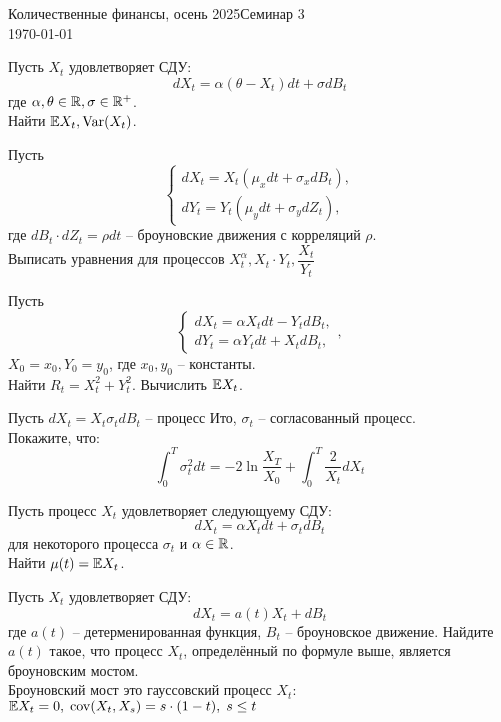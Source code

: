 \documentclass[12pt]{article}
\begin{document}
\noindent Количественные финансы, осень 2025\hfill Семинар 3\\
\today

\hrulefill
\begin{problem}
    Пусть $X_t$ удовлетворяет СДУ:
    $$
        dX_t = \alpha (\theta -  X_t) dt + \sigma dB_t
    $$где $\alpha, \theta \in \mathbb{R}, \sigma \in \mathbb{R}^+$. \\
    Найти $\mathbb{E} X_t, \mathrm{Var}(X_t)$. 
\end{problem}
 
\begin{problem}
    Пусть
    $$\begin{cases}
        dX_t = X_t (\mu_x dt + \sigma_x dB_t), \\
        dY_t = Y_t (\mu_y dt + \sigma_y dZ_t),
    \end{cases}$$
    где $dB_t\cdot dZ_t = \rho dt$ -- броуновские движения с корреляций $\rho$. 
    \\ Выписать уравнения для процессов $X_t^{\alpha}, X_t \cdot Y_t, \dfrac{X_t}{Y_t}$
\end{problem}

\begin{problem}
    Пусть
    $$\begin{cases}
        dX_t = \alpha X_t dt - Y_t dB_t, \\
        dY_t = \alpha Y_t dt + X_t dB_t,
    \end{cases},$$ $X_0=x_0, Y_0=y_0$, где $x_0, y_0$ -- константы.
    \\ Найти $R_t = X_t^2 + Y_t^2$. Вычислить $\mathbb{E} X_t$.
\end{problem}

\begin{problem}
    Пусть $dX_t = X_t \sigma_t dB_t$ -- процесс Ито, $\sigma_t$ -- согласованный процесс.
    \\ Покажите, что:
    $$
        \int_0^T \sigma^2_t dt = -2\ln \dfrac{X_T}{X_0} + \int_0^T \dfrac{2}{X_t}dX_t
    $$
\end{problem}

\begin{problem}
    Пусть процесс $X_t$ удовлетворяет следующуему СДУ:
    $$
        dX_t = \alpha X_t dt + \sigma_t dB_t
    $$для некоторого процесса $\sigma_t$ и $\alpha \in \mathbb{R}$. 
    \\ Найти $\mu(t)=\mathbb{E} X_t$.
\end{problem}

\begin{problem}
    Пусть $X_t$ удовлетворяет СДУ:    
    $$
        dX_t = a(t) X_t + dB_t
    $$ где $a(t)$ -- детерменированная функция, $B_t$ -- броуновское движение. 
    Найдите $a(t)$ такое, что процесс $X_t$, определённый по формуле выше, является броуновским мостом.
    \\ Броуновский мост это гауссовский процесс $X_t$: $\mathbb{E} X_t = 0, \; \mathrm{cov}(X_t, X_s) = s\cdot (1 - t), \; s \leq t$
\end{problem}
\end{document}
